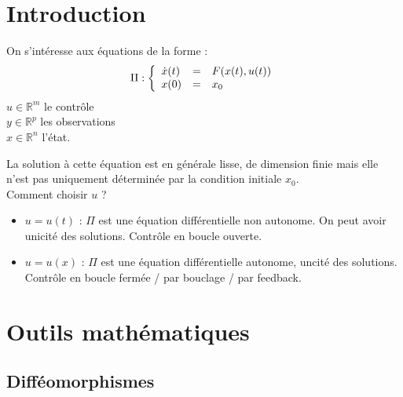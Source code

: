 \section*{Introduction}
On s'intéresse aux équations de la forme :
\[\Pi : \left\{\begin{array}{l c l}
	\dot{x}(t)&=&F(x(t),u(t))\\
	x(0)&=&x_0
\end{array}\right.\]
$u\in\mathbb{R}^m$ le contrôle\\
$y\in\mathbb{R}^p$ les observations\\
$x\in\mathbb{R}^n$ l'état.

\bigskip
La solution à cette équation est en générale lisse, de dimension finie mais elle n'est pas uniquement déterminée par la condition initiale $x_0$.\\
Comment choisir $u$ ?
\begin{itemize}
	\item $u=u(t)$ : $\Pi$ est une équation différentielle non autonome. On peut avoir unicité des solutions. Contrôle en boucle ouverte.
	\item $u=u(x)$ : $\Pi$ est une équation différentielle autonome, uncité des solutions. Contrôle en boucle fermée / par bouclage / par feedback.
\end{itemize}

\section{Outils mathématiques}
\subsection{Difféomorphismes}


